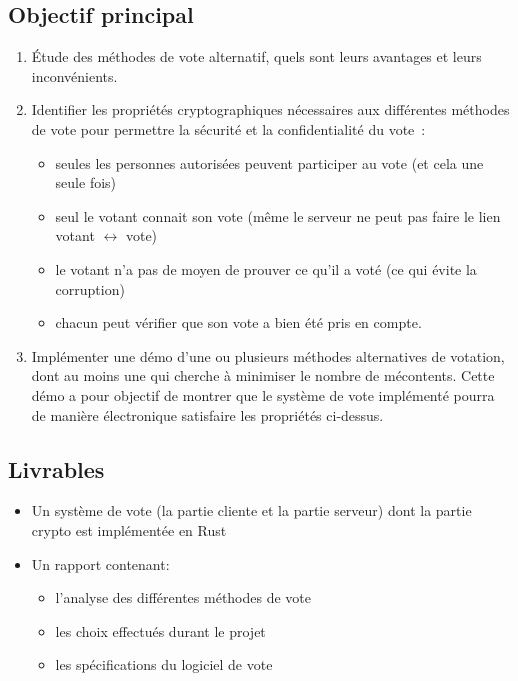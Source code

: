 \documentclass[../report]{subfiles}
\begin{document}
\subsection{Objectif principal}\label{ssec:cdc:cdc:objprinc}
\begin{enumerate}
  \item Étude des méthodes de vote alternatif, quels sont leurs avantages et leurs inconvénients.
  \item Identifier les propriétés cryptographiques nécessaires aux différentes méthodes de vote pour permettre la sécurité et la confidentialité du vote~:
    \begin{itemize}
      \item seules les personnes autorisées peuvent participer au vote (et cela une seule fois)
      \item seul le votant connait son vote (même le serveur ne peut pas faire le lien votant $\longleftrightarrow$ vote)
      \item le votant n'a pas de moyen de prouver ce qu'il a voté (ce qui évite la corruption)
      \item chacun peut vérifier que son vote a bien été pris en compte.
    \end{itemize}
  \item Implémenter une démo d'une ou plusieurs méthodes alternatives de votation, dont au moins une qui cherche à minimiser le nombre de mécontents. Cette démo a pour objectif de montrer que le système de vote implémenté pourra de manière électronique satisfaire les propriétés ci-dessus.
\end{enumerate}

\subsection{Livrables}
    \begin{itemize}
      \item Un système de vote (la partie cliente et la partie serveur) dont la partie crypto est implémentée en Rust
      \item Un rapport contenant: 
      \begin{itemize}
        \item l'analyse des différentes méthodes de vote
        \item les choix effectués durant le projet
        \item les spécifications du logiciel de vote
      \end{itemize}
    \end{itemize}
\end{document}
